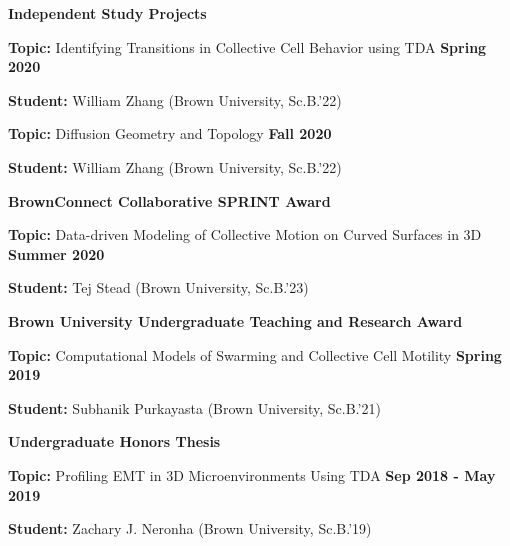 \documentclass[margin,line]{res}
\newenvironment{list1}{
  \begin{list}{\ding{113}}{
      \setlength{\itemsep}{0in}
      \setlength{\parsep}{0in} \setlength{\parskip}{0in}
      \setlength{\topsep}{0in} \setlength{\partopsep}{0in}
      \setlength{\leftmargin}{0.17in}}}{\end{list}}
\begin{document}
\begin{resume}
{\bf Independent Study Projects}
\vspace*{.2cm}
\begin{list1}
\setlength\itemsep{0.2em}
\item[] {\bf Topic:} Identifying Transitions in Collective Cell Behavior using TDA \hfill {\bf Spring 2020}
\item[] {\bf Student:} William Zhang (Brown University, Sc.B.'22) 
\end{list1}
\vspace*{.2cm}
\begin{list1}
\setlength\itemsep{0.2em}
\item[] {\bf Topic:} Diffusion Geometry and Topology \hfill {\bf Fall 2020}
\item[] {\bf Student:} William Zhang (Brown University, Sc.B.'22)
\end{list1}


{\bf BrownConnect Collaborative SPRINT Award}
\vspace*{.2cm}
\begin{list1}
\setlength\itemsep{0.2em}
\item[] {\bf Topic:} Data-driven Modeling of Collective Motion on Curved Surfaces in 3D \hfill {\bf Summer 2020}
\item[] {\bf Student:} Tej Stead (Brown University, Sc.B.'23)
\end{list1}

{\bf Brown University Undergraduate Teaching and Research Award}
\vspace*{.2cm}
\begin{list1}
\setlength\itemsep{0.2em}
\item[] {\bf Topic:} Computational Models of Swarming and Collective Cell Motility \hfill {\bf Spring 2019}
\item[] {\bf Student:} Subhanik Purkayasta (Brown University, Sc.B.'21)
\end{list1}

{\bf Undergraduate Honors Thesis}
\vspace*{.2cm}
\begin{list1}
\setlength\itemsep{0.2em}
\item[] {\bf Topic:} Profiling EMT in 3D Microenvironments Using TDA \hfill {\bf Sep 2018 - May 2019}
\item[] {\bf Student:} Zachary J. Neronha (Brown University, Sc.B.'19) 
\end{list1}


\end{resume}
\end{document}
